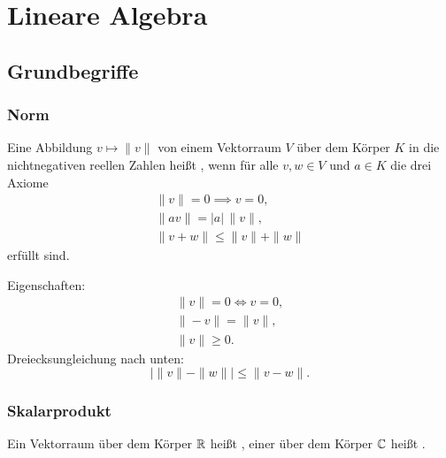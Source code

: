 
\chapter{Lineare Algebra}
\section{Grundbegriffe}
\subsection{Norm}
\begin{definition}[Norm]\mbox{}\newline
Eine Abbildung $v\mapsto\|v\|$ von einem
Vektorraum $V$ über dem Körper $K$ in die nichtnegativen reellen
Zahlen heißt , wenn für alle $v,w\in V$ und $a\in K$
die drei Axiome%
\begin{gather}
\|v\|=0 \implies v=0,\\
\|av\| = |a|\,\|v\|,\\
\|v+w\| \le \|v\|+\|w\|
\end{gather}
erfüllt sind.
\end{definition}

Eigenschaften:
\begin{gather}
\|v\|=0\iff v=0,\\
\|-v\|=\|v\|,\\
\|v\|\ge 0.
\end{gather}
Dreiecksungleichung nach unten:
\begin{equation}
|\|v\|-\|w\||\le \|v-w\|.
\end{equation}

\subsection{Skalarprodukt}

Ein Vektorraum über dem Körper $\mathbb R$ heißt ,
einer über dem Körper $\mathbb C$ heißt .

